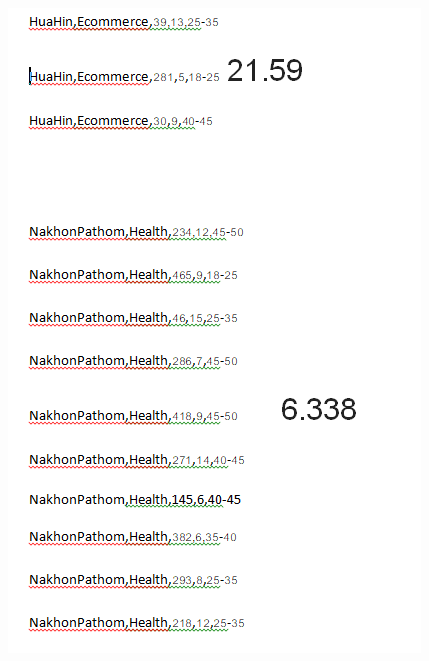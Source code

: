\documentclass[11pt]{article}
\begin{document}
\begin{figure}[h]
\centering
\includegraphics[scale=0.4]{cal1}

\end{figure}
\end{document}
